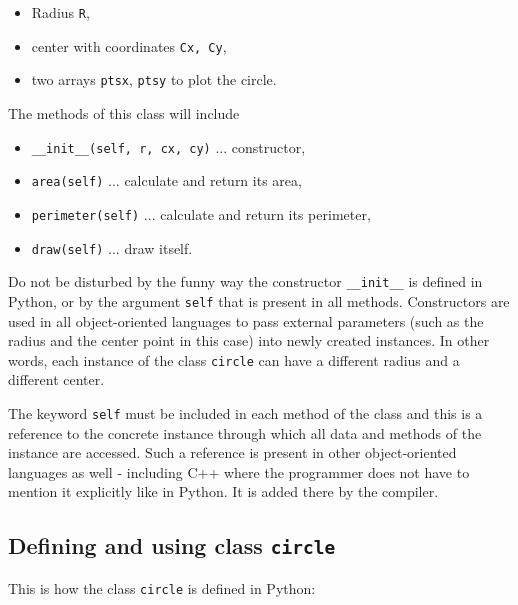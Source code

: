 \documentclass[article,A4,12pt]{llncs}
\begin{document}
\begin{itemize}
\item Radius {\tt R}, 
\item center with coordinates {\tt Cx, Cy}, 
\item two arrays {\tt ptsx}, {\tt ptsy} to plot the circle. 
\end{itemize}
The methods of this class will include 
\begin{itemize}
\item {\tt \_\_init\_\_(self, r, cx, cy)} ... constructor,
\item {\tt area(self)} ... calculate and return its area,
\item {\tt perimeter(self)} ... calculate and return its perimeter,
\item {\tt draw(self)} ... draw itself.
\end{itemize}
Do not be disturbed by the funny way the constructor {\tt \_\_init\_\_} 
is defined in Python, or by the argument {\tt self} that is present 
in all methods. Constructors are 
used in all object-oriented languages to pass external parameters 
(such as the radius and the center point in this case) into newly 
created instances. In other words, each instance of the class {\tt circle} 
can have a different radius and a different center.

The keyword {\tt self} must be included in each method of the class 
and this is a reference to the concrete instance through which all
data and methods of the instance are accessed. Such a reference is present 
in other object-oriented languages as well - including C++ where the programmer
does not have to mention it explicitly like in Python. It is added there by 
the compiler.

\subsection{Defining and using class {\tt circle}} \label{subsec:circle}

This is how the class {\tt circle} is defined in Python:\\
\end{document}
